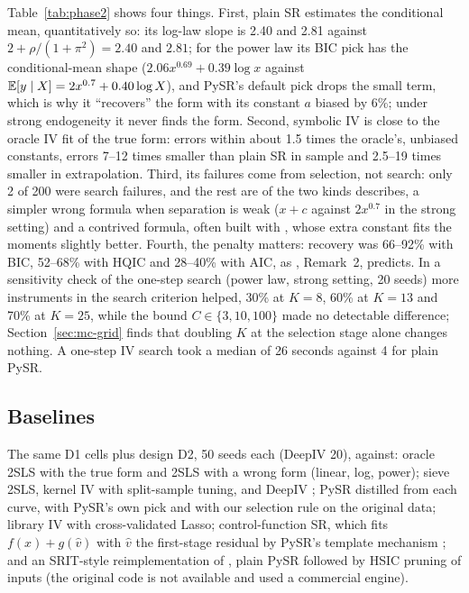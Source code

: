 Table~\ref{tab:phase2} shows four things. First, plain SR estimates the conditional mean, quantitatively so: its log-law slope is 2.40 and 2.81 against $2 + \rho/(1 + \pi^2) = 2.40$ and $2.81$; for the power law its BIC pick has the conditional-mean shape ($2.06x^{0.69} + 0.39\log x$ against $\mathbb{E}[y \mid X] = 2x^{0.7} + 0.40\log X$), and PySR's default pick drops the small term, which is why it ``recovers'' the form with its constant $a$ biased by 6\%; under strong endogeneity it never finds the form. Second, symbolic IV is close to the oracle IV fit of the true form: errors within about 1.5 times the oracle's, unbiased constants, errors 7--12 times smaller than plain SR in sample and 2.5--19 times smaller in extrapolation. Third, its failures come from selection, not search: only 2 of 200 were search failures, and the rest are of the two kinds  describes, a simpler wrong formula when separation is weak ($x + c$ against $2x^{0.7}$ in the strong setting) and a contrived formula, often built with , whose extra constant fits the moments slightly better. Fourth, the penalty matters: recovery was 66--92\% with BIC, 52--68\% with HQIC and 28--40\% with AIC, as , Remark~2, predicts. In a sensitivity check of the one-step search (power law, strong setting, 20 seeds) more instruments in the search criterion helped, 30\% at $K = 8$, 60\% at $K = 13$ and 70\% at $K = 25$, while the bound $C \in \{3, 10, 100\}$ made no detectable difference; Section~\ref{sec:mc-grid} finds that doubling $K$ at the selection stage alone changes nothing. A one-step IV search took a median of 26 seconds against 4 for plain PySR.

\subsection{Baselines}
\label{sec:mc-baselines}

The same D1 cells plus design D2, 50 seeds each (DeepIV 20), against: oracle 2SLS with the true form and 2SLS with a wrong form (linear, log, power); sieve 2SLS, kernel IV \citep{singh2019} with split-sample tuning, and DeepIV \citep{hartford2017}; PySR distilled from each curve, with PySR's own pick and with our selection rule on the original data; library IV with cross-validated Lasso; control-function SR, which fits $f(x) + g(\hat v)$ with $\hat v$ the first-stage residual by PySR's template mechanism \citep{neweypowellvella1999}; and an SRIT-style reimplementation of \citet{yan_srit}, plain PySR followed by HSIC pruning of inputs (the original code is not available and used a commercial engine).

